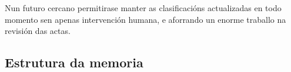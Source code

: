     Nun futuro cercano permitirase manter as clasificacións actualizadas en todo 
momento sen apenas intervención humana, e aforrando un enorme traballo na 
revisión das actas.

  \subsection{Estrutura da memoria}
  
  
  
